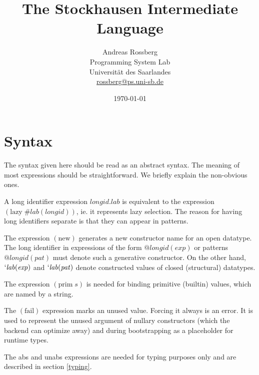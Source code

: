 \documentclass[twoside]{article}
\newcommand{\x}[1]{\mathit{#1}}
\newcommand{\f}[1]{\mbox{#1}}
\newcommand{\lab}{\x{lab}}
\newcommand{\longid}{\x{longid}}
\renewcommand{\exp}{\x{exp}}
\newcommand{\pat}{\x{pat}}
\begin{document}

\title{The Stockhausen Intermediate Language}
\author{Andreas Rossberg \\
Programming System Lab \\
Universit\"at des Saarlandes \\
\url{rossberg@ps.uni-sb.de}}
\date{\today}

\maketitle


\section{Syntax}
\label{syntax}

The syntax given here should be read as an abstract syntax. The meaning of most expressions should be straightforward. We briefly explain the non-obvious ones.

A long identifier expression $\longid.\lab$ is equivalent to the expression $(\f{lazy}\; \#\lab(\longid))$, ie. it represents lazy selection. The reason for having long identifiers separate is that they can appear in patterns.

The expression $(\f{new})$ generates a new constructor name for an open datatype. The long identifier in expressions of the form $@\longid(\exp)$ or patterns $@\longid(\pat)$ must denote such a generative constructor. On the other hand, $`\lab(\exp)$ and $`\lab(\pat)$ denote constructed values of closed (structural) datatypes.

The expression $(\f{prim}\;s)$ is needed for binding primitive (builtin) values, which are named by a string.

The $(\f{fail})$ expression marks an unused value. Forcing it always is an error. It is used to represent the unused argument of nullary constructors (which the backend can optimize away) and during bootstrapping as a placeholder for runtime types.

The \f{abs} and \f{unabs} expressions are needed for typing purposes only and are described in section \ref{typing}.
\end{document}
